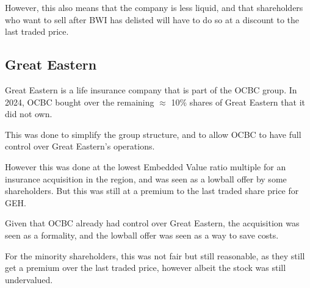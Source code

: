 However, this also means that the company is less liquid, and that shareholders who want to sell after BWI has delisted will have to do so at a discount to the last traded price.

\subsection{Great Eastern}
Great Eastern is a life insurance company that is part of the OCBC group. In 2024, OCBC bought over the remaining $\approx$ 10\% shares of Great Eastern that it did not own.

This was done to simplify the group structure, and to allow OCBC to have full control over Great Eastern's operations.

However this was done at the lowest Embedded Value ratio multiple for an insurance acquisition in the region, and was seen as a lowball offer by some shareholders. But this was still at a premium to the last traded share price for GEH.

Given that OCBC already had control over Great Eastern, the acquisition was seen as a formality, and the lowball offer was seen as a way to save costs.

For the minority shareholders, this was not fair but still reasonable, as they still get a premium over the last traded price, however albeit the stock was still undervalued.
